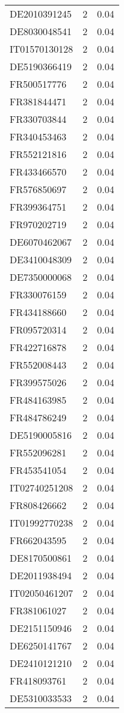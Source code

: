 \begin{table*}[htbp]
\begin{tabular}{lrr}
DE2010391245 & 2 & 0.04 \\
DE8030048541 & 2 & 0.04 \\
IT01570130128 & 2 & 0.04 \\
DE5190366419 & 2 & 0.04 \\
FR500517776 & 2 & 0.04 \\
FR381844471 & 2 & 0.04 \\
FR330703844 & 2 & 0.04 \\
FR340453463 & 2 & 0.04 \\
FR552121816 & 2 & 0.04 \\
FR433466570 & 2 & 0.04 \\
FR576850697 & 2 & 0.04 \\
FR399364751 & 2 & 0.04 \\
FR970202719 & 2 & 0.04 \\
DE6070462067 & 2 & 0.04 \\
DE3410048309 & 2 & 0.04 \\
DE7350000068 & 2 & 0.04 \\
FR330076159 & 2 & 0.04 \\
FR434188660 & 2 & 0.04 \\
FR095720314 & 2 & 0.04 \\
FR422716878 & 2 & 0.04 \\
FR552008443 & 2 & 0.04 \\
FR399575026 & 2 & 0.04 \\
FR484163985 & 2 & 0.04 \\
FR484786249 & 2 & 0.04 \\
DE5190005816 & 2 & 0.04 \\
FR552096281 & 2 & 0.04 \\
FR453541054 & 2 & 0.04 \\
IT02740251208 & 2 & 0.04 \\
FR808426662 & 2 & 0.04 \\
IT01992770238 & 2 & 0.04 \\
FR662043595 & 2 & 0.04 \\
DE8170500861 & 2 & 0.04 \\
DE2011938494 & 2 & 0.04 \\
IT02050461207 & 2 & 0.04 \\
FR381061027 & 2 & 0.04 \\
DE2151150946 & 2 & 0.04 \\
DE6250141767 & 2 & 0.04 \\
DE2410121210 & 2 & 0.04 \\
FR418093761 & 2 & 0.04 \\
DE5310033533 & 2 & 0.04 \\

\end{tabular}
\end{table*}
